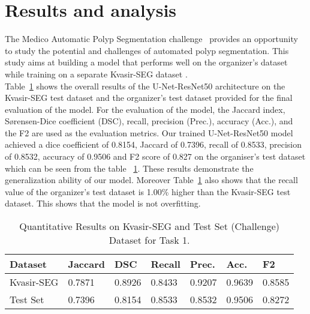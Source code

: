 \documentclass[sigconf]{acmart-me}
\begin{document}
\section{Results and analysis}
The Medico Automatic Polyp Segmentation challenge~\cite{jha2020medico} provides an opportunity to study the potential and challenges of automated polyp segmentation. This study aims at building a model that performs well on the organizer's dataset while training on a separate Kvasir-SEG dataset \cite{jha2020kvasir}.\\
\indent Table~\ref{table:quantative_results} shows the overall results of the U-Net-ResNet50 architecture on the Kvasir-SEG test dataset and the organizer's test dataset provided for the final evaluation of the model. For the evaluation of the model, the Jaccard index, S{\o}rensen-Dice coefficient (DSC), recall, precision (Prec.), accuracy (Acc.), and the F2 are used as the evaluation metrics. Our trained U-Net-ResNet50 model achieved a dice coefficient of 0.8154, Jaccard of 0.7396, recall of 0.8533, precision of 0.8532, accuracy of 0.9506 and F2 score of 0.827 on the organiser's test dataset  which can be seen from the table ~\ref{table:quantative_results}. These results demonstrate the generalization ability of our model. Moreover Table~\ref{table:quantative_results} also shows that the recall value of the organizer's test dataset is 1.00\% higher than the Kvasir-SEG test dataset. This shows that the model is not overfitting. 



\begin{table}[t]
 \caption{Quantitative Results on Kvasir-SEG and Test Set (Challenge) Dataset for Task 1.}
    \label{table:quantative_results}
    \def\arraystretch{2.0}
     \setlength\tabcolsep{2.2pt}
\centering
  \begin{tabular}{@{}l|l|l|l|l|l|l@{}}
\hline
\textbf{Dataset}& \textbf{Jaccard} & \textbf{DSC} & \textbf{Recall} & \textbf{Prec.} & \textbf{Acc.} & \textbf{F2} \\ \hline
Kvasir-SEG & 0.7871 & 0.8926 & 0.8433 & 0.9207 & 0.9639 & 0.8585 \\ \hline
Test Set     & 0.7396 & 0.8154 & 0.8533 & 0.8532 & 0.9506 & 0.8272  \\ \hline
\end{tabular}
\end{table} 
\end{document}
